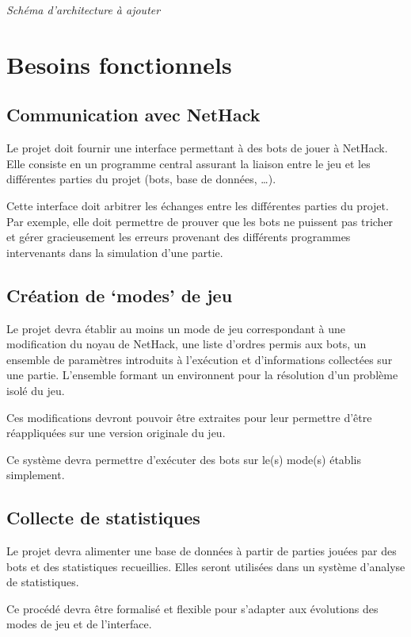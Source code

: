 \documentclass[12pt]{article}
\begin{document}
\emph{Schéma d'architecture à ajouter}

\section{Besoins fonctionnels}

\subsection{Communication avec NetHack}

Le projet doit fournir une interface permettant à des bots de jouer à
NetHack. Elle consiste en un programme central assurant la liaison entre
le jeu et les différentes parties du projet (bots, base de données,
\ldots{}).

Cette interface doit arbitrer les échanges entre les différentes parties
du projet. Par exemple, elle doit permettre de prouver que les bots ne
puissent pas tricher et gérer gracieusement les erreurs provenant des
différents programmes intervenants dans la simulation d'une partie.

\subsection{Création de `modes' de jeu}

Le projet devra établir au moins un mode de jeu correspondant à une
modification du noyau de NetHack, une liste d'ordres permis aux bots, un
ensemble de paramètres introduits à l'exécution et d'informations
collectées sur une partie. L'ensemble formant un environnent pour la
résolution d'un problème isolé du jeu.

Ces modifications devront pouvoir être extraites pour leur permettre
d'être réappliquées sur une version originale du jeu.

Ce système devra permettre d'exécuter des bots sur le(s) mode(s) établis
simplement.

\subsection{Collecte de statistiques}

Le projet devra alimenter une base de données à partir de parties jouées
par des bots et des statistiques recueillies. Elles seront utilisées
dans un système d'analyse de statistiques.

Ce procédé devra être formalisé et flexible pour s'adapter aux
évolutions des modes de jeu et de l'interface.
\end{document}
